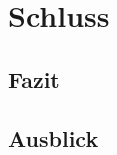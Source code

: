 \documentclass[../../main.tex]{subfiles}
\begin{document}
\section{Schluss}
\subsection{Fazit}
\subsection{Ausblick}
\end{document}
